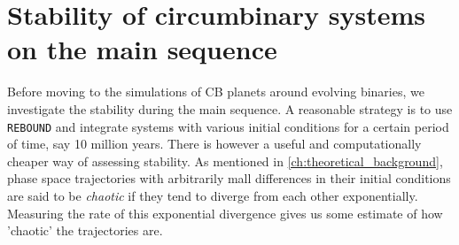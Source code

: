 \documentclass[twoside,openright,titlepage,numbers=noenddot,headinclude,%
                footinclude=true,cleardoublepage=empty,abstractoff, 
                BCOR=5mm,paper=a4,fontsize=11pt,%
                american,%
                ]{scrreprt}%
\begin{document}
\section{Stability of circumbinary systems on the main sequence}
\label{sec:Stability of observed circumbinary planets on the main sequence}
Before moving  to the simulations of CB planets around evolving
binaries, we investigate the stability during the main sequence. A reasonable
strategy is to use \texttt{REBOUND} and integrate systems with various initial
conditions for a certain period of time, say 10 million years. There is however
a useful and computationally cheaper way of assessing stability. As mentioned
in \cref{ch:theoretical_background}, phase space trajectories with arbitrarily 
mall differences in their initial conditions are said to be 
\emph{chaotic} if they tend to diverge 
from each other exponentially.  Measuring the rate of this exponential 
divergence gives us some estimate of how 'chaotic' the trajectories are.
\end{document}
